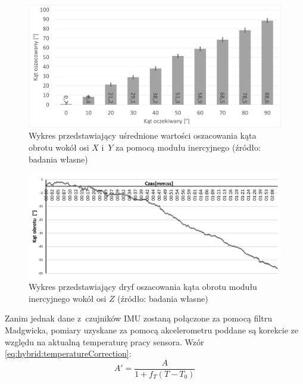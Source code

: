 \begin{savenotes}
	\begin{figure}[!htb]																													
		\centering 
		\includegraphics[width=\textwidth]{images/imumeasuredAngles.png}
		\caption{Wykres przedstawiający uśrednione wartości oszacowania kąta obrotu wokół osi $X$ i~$Y$ za pomocą modułu inercyjnego (źródło: badania własne)}
		\label{fig:hybrid:imu:XYRot}
	\end{figure}
\end{savenotes}
\begin{savenotes}
	\begin{figure}[!htb]
		\centering 
		\includegraphics[width=\textwidth]{images/imuDrift.png}
		\caption{Wykres przedstawiający dryf oszacowania kąta obrotu modułu inercyjnego wokół osi $Z$ (źródło: badania własne)}
		\label{fig:hybrid:imu:drift}																														
	\end{figure}
\end{savenotes}
						
Zanim jednak dane z~czujników IMU zostaną połączone za pomocą filtru Madgwicka, pomiary uzyskane za pomocą akcelerometru poddane są korekcie ze względu na aktualną temperaturę pracy sensora. Wzór \ref{eq:hybrid:temperatureCorrection}:
\begin{equation}
	A' = \frac{A}{1+f_T (T-T_0)}
	\label{eq:hybrid:temperatureCorrection}
\end{equation}

